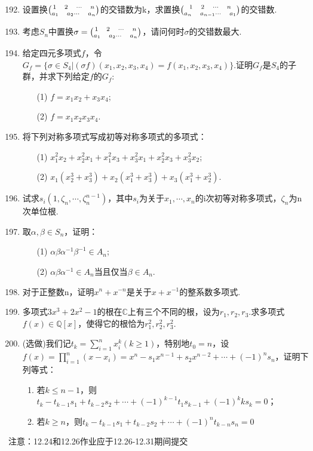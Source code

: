 \documentclass[a4paper,12pt]{article}
\begin{document}
\begin{enumerate}\setcounter{enumi}{191}
    \item 设置换$\tbinom{1 \quad 2 \quad \cdots \quad n}{a_1 \quad a_2 \cdots \quad a_n}$的交错数为k，求置换$\tbinom{1 \quad 2 \quad \cdots \quad n}{a_n \quad a_{n-1} \cdots \quad a_1}$的交错数.
    \item 考虑$S_n$中置换$\sigma=\tbinom{1 \quad 2 \quad \cdots \quad n}{a_1 \quad a_2 \cdots \quad a_n}$，请问何时$\sigma$的交错数最大.
    \item 给定四元多项式$f$，令$G_f=\{\sigma \in S_4| (\sigma f)(x_1,x_2,x_3,x_4)=f(x_1,x_2,x_3,x_4)\}$.证明$G_f$是$S_4$的子群，并求下列给定$f$的$G_f$:\begin{enumerate}
        \item[(1)] $f=x_1x_2+x_3x_4$;
        \item[(2)] $f=x_1x_2x_3x_4$.
    \end{enumerate}
    \item 将下列对称多项式写成初等对称多项式的多项式：\begin{enumerate}
        \item[(1)] $x_1^2x_2+x_2^2x_1+x_1^2x_3+x_3^2x_1+x_2^2x_3+x_3^2x_2$;
        \item[(2)] $x_1(x_2^3+x_3^3)+x_2(x_1^3+x_3^3)+x_3(x_1^3+x_2^3)$.
    \end{enumerate}
    \item 试求$s_i(1,\zeta_n,\cdots,\zeta_n^{n-1})$，其中$s_i$为关于$x_1,\cdots,x_n$的i次初等对称多项式，$\zeta_n$为n次单位根.
    \item 取$\alpha,\beta \in S_n$，证明：\begin{enumerate}
        \item[(1)] $\alpha\beta\alpha^{-1}\beta^{-1} \in A_n$;
        \item[(2)] $\alpha\beta\alpha^{-1}\in A_n$当且仅当$\beta \in A_n$. 
    \end{enumerate}
    \item 对于正整数n，证明$x^n+x^{-n}$是关于$x+x^{-1}$的整系数多项式.
    \item 多项式$3x^3+2x^2-1$的根在$\mathbb{C}$上有三个不同的根，设为$r_1,r_2,r_3$.求多项式$f(x) \in \mathbb{Q}[x]$，使得它的根恰为$r_1^2,r_2^2,r_3^2$.
    \item({\color{red}选做})我们记$t_k=\sum\limits_{i=1}^{n}x_i^{k}(k\geq 1)$，特别地$t_0=n$，设$f(x)=\prod\limits_{i=1}^n(x-x_i)=x^n-s_1x^{n-1}+s_2x^{n-2}+\cdots+(-1)^ns_n$，证明下列等式：\begin{enumerate}
        \item 若$k\leq n-1$，则$t_k-t_{k-1}s_1+t_{k-2}s_2+\cdots+(-1)^{k-1}t_1s_{k-1}+(-1)^{k}ks_k=0$；
        \item 若$k\geq n$，则$t_k-t_{k-1}s_1+t_{k-2}s_2+\cdots+(-1)^nt_{k-n}s_n=0$
    \end{enumerate}
\end{enumerate}

{\color{red} 注意：12.24和12.26作业应于12.26-12.31期间提交}
 
\end{document}
